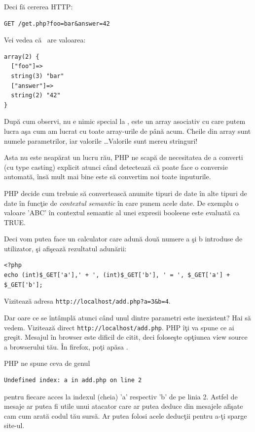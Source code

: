 Deci fă cererea HTTP:
\begin{verbatim}
GET /get.php?foo=bar&answer=42
\end{verbatim}

Vei vedea că \get\ are valoarea:
\begin{verbatim}
array(2) {
  ["foo"]=>
  string(3) "bar"
  ["answer"]=>
  string(2) "42"
}
\end{verbatim}
După cum observi, nu e nimic special la \get, este un array asociativ
cu care putem lucra aşa cum am lucrat cu toate array-urile de până acum.
Cheile din array sunt numele parametrilor, iar valorile \ldots Valorile sunt
mereu stringuri!

Asta nu este neapărat un lucru rău, PHP ne scapă de necesitatea de a converti
(cu type casting) explicit atunci când detectează că poate face o conversie
automată, însă mult mai bine este să convertim noi toate inputurile.

PHP decide cum trebuie să convertească anumite tipuri de date în alte tipuri
de date în funcţie de \textit{contextul semantic} în care punem acele date. De exemplu
o valoare 'ABC' în contextul semantic al unei expresii booleene este evaluată
ca TRUE.


Deci vom putea face un calculator care adună două numere a şi b
introduse de utilizator, şi afişează rezultatul adunării:
\begin{lstlisting}
<?php
echo (int)$_GET['a'],' + ', (int)$_GET['b'], ' = ', $_GET['a'] + $_GET['b'];
\end{lstlisting}
Vizitează adresa \texttt{http://localhost/add.php?a=3\&b=4}.

Dar oare ce se întâmplă atunci când unul dintre parametri este inexistent?
Hai să vedem. Vizitează direct \texttt{http://localhost/add.php}. PHP îţi
va spune ce ai greşit. Mesajul în browser este dificil de citit, deci
foloseşte opţiunea {\glqq}view source{\grqq} a browserului tău. În firefox, poţi apăsa
.

PHP ne spune ceva de genul
\begin{verbatim}
Undefined index: a in add.php on line 2
\end{verbatim}
pentru fiecare acces la indexul (cheia) 'a' respectiv 'b'
de pe linia 2. Astfel de mesaje ar putea fi utile unui
atacator care ar putea deduce din mesajele afişate cam cum
arată codul tău sursă. Ar putea folosi acele deducţii pentru
a-ţi sparge site-ul.

